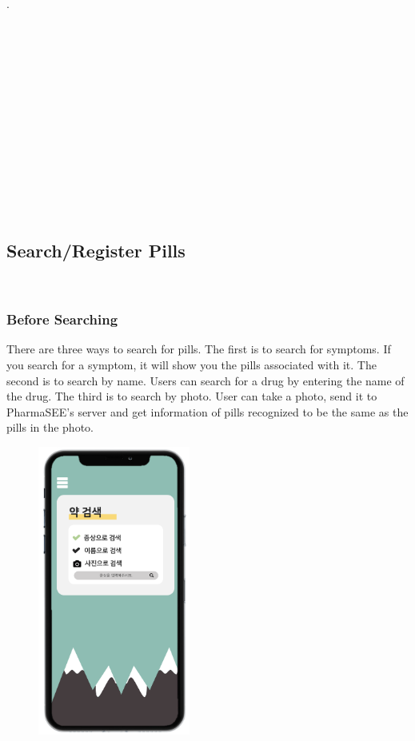 \documentclass[conference]{IEEEtran}
\begin{document}
.\\
\\
\\
\\
\\
\\
\\
\\
\\
\\
\\
\\
\\
\\


\subsection{Search/Register Pills}\\

\subsubsection{Before Searching}
There are three ways to search for pills. The first is to search for symptoms. If you search for a symptom, it will show you the pills associated with it. The second is to search by name. Users can search for a drug by entering the name of the drug. The third is to search by photo. User can take a photo, send it to PharmaSEE's server and get information of pills recognized to be the same as the pills in the photo.\\

\begin{figure}[h!]
\centering
\includegraphics[width=5cm]{final_image_folder/search.png}
\caption{}
\label{fig:map}
\end{figure}
\end{document}
